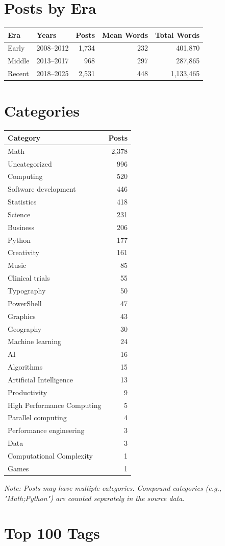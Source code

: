 \bigskip

\section*{Posts by Era}

\begin{longtable}{l l r r r}
\toprule
\textbf{Era} & \textbf{Years} & \textbf{Posts} & \textbf{Mean Words} & \textbf{Total Words} \tabularnewline
\midrule
Early & 2008--2012 & 1,734 & 232 & 401,870 \tabularnewline
Middle & 2013--2017 & 968 & 297 & 287,865 \tabularnewline
Recent & 2018--2025 & 2,531 & 448 & 1,133,465 \tabularnewline
\bottomrule
\end{longtable}

\bigskip

\section*{Categories}

\begin{longtable}{p{4.5cm} r}
\toprule
\textbf{Category} & \textbf{Posts} \tabularnewline
\midrule
Math & 2,378 \tabularnewline
Uncategorized & 996 \tabularnewline
Computing & 520 \tabularnewline
Software development & 446 \tabularnewline
Statistics & 418 \tabularnewline
Science & 231 \tabularnewline
Business & 206 \tabularnewline
Python & 177 \tabularnewline
Creativity & 161 \tabularnewline
Music & 85 \tabularnewline
Clinical trials & 55 \tabularnewline
Typography & 50 \tabularnewline
PowerShell & 47 \tabularnewline
Graphics & 43 \tabularnewline
Geography & 30 \tabularnewline
Machine learning & 24 \tabularnewline
AI & 16 \tabularnewline
Algorithms & 15 \tabularnewline
Artificial Intelligence & 13 \tabularnewline
Productivity & 9 \tabularnewline
High Performance Computing & 5 \tabularnewline
Parallel computing & 4 \tabularnewline
Performance engineering & 3 \tabularnewline
Data & 3 \tabularnewline
Computational Complexity & 1 \tabularnewline
Games & 1 \tabularnewline
\bottomrule
\end{longtable}

\textit{Note: Posts may have multiple categories. Compound categories (e.g., "Math;Python") are counted separately in the source data.}


\bigskip

\section*{Top 100 Tags}

